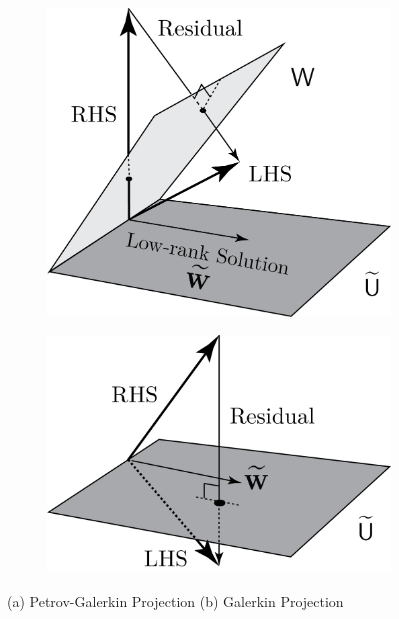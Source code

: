 \documentclass[11pt]{article}
\begin{document}
\begin{itemize}
                    \begin{figure}[t]
                    \centering
                    \begin{subfigure}[b]{0.35\linewidth}
                    \centering
                    \includegraphics[width=\linewidth]{PG.png}
                    \caption{}
                    \label{fig:projections_PG}
                    \end{subfigure}\hfill
                    \begin{subfigure}[b]{0.35\linewidth}
                    \centering
                    \includegraphics[width=\linewidth]{G.png}
                    \caption{}
                    \label{fig:projections_G}
                    \end{subfigure}
                    \caption{(a) Petrov-Galerkin Projection (b) Galerkin Projection}
                    \label{fig:projections}
                    \end{figure}


\end{itemize}
\end{document}
